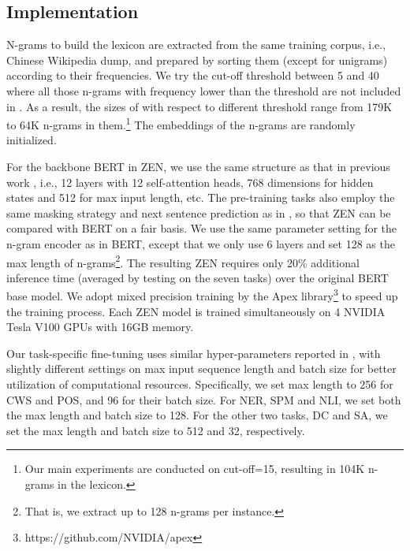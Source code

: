 \documentclass[11pt,a4paper]{article}
\begin{document}
\begin{CJK}{UTF8}{gbsn}
\subsection{Implementation}
N-grams to build the lexicon  are extracted from the same training corpus, i.e., Chinese Wikipedia dump, and prepared by sorting them (except for unigrams) according to their frequencies.
We try the cut-off threshold between 5 and 40 where all those n-grams with frequency lower than the threshold are not included in .
As a result, the sizes of  with respect to different threshold range from 179K to 64K n-grams in them.\footnote{Our main experiments are conducted on cut-off=15, resulting in 104K n-grams in the lexicon.}
The embeddings of the n-grams are randomly initialized.

For the backbone BERT in ZEN, we use the same structure as that in previous work \citep{devlin2018bert, sun2019ernie, cui2019pre}, i.e., 12 layers with 12 self-attention heads, 768 dimensions for hidden states and 512 for max input length, etc.
The pre-training tasks also employ the same masking strategy and next sentence prediction as in \citet{devlin2018bert},
so that ZEN can be compared with BERT on a fair basis.
We use the same parameter setting for the n-gram encoder as in BERT,
except that we only use 6 layers and set 128 as the max length of n-grams\footnote{That is, we extract up to 128 n-grams per instance.}. The resulting ZEN requires only 20\% additional inference time (averaged by testing on the seven tasks) over the original BERT base model.
We adopt mixed precision training \citep{micikevicius2017mixed} by the Apex library\footnote{https://github.com/NVIDIA/apex} to speed up the training process.
Each ZEN model is trained simultaneously on 4 NVIDIA Tesla V100 GPUs with 16GB memory.








Our task-specific fine-tuning uses similar hyper-parameters reported in \citet{cui2019pre},
with slightly different settings on max input sequence length and batch size
for better utilization of computational resources.
Specifically, we set max length to 256 for CWS and POS, and 96 for their batch size.
For NER, SPM and NLI, we set both the max length and batch size to 128.
For the other two tasks, DC and SA, we set the max length and batch size to 512 and 32, respectively.

















\end{CJK}
\end{document}
